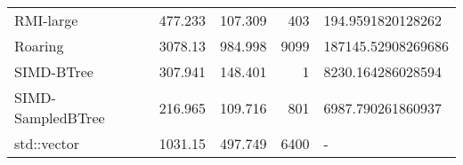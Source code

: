 \begin{tabular}{lrrrl}
 RMI-large         &                477.233 &               107.309 &          403 & 194.9591820128262  \\
 Roaring           &               3078.13  &               984.998 &         9099 & 187145.52908269686 \\
 SIMD-BTree        &                307.941 &               148.401 &            1 & 8230.164286028594  \\
 SIMD-SampledBTree &                216.965 &               109.716 &          801 & 6987.790261860937  \\
 std::vector       &               1031.15  &               497.749 &         6400 & -                  \\
\hline
\end{tabular}